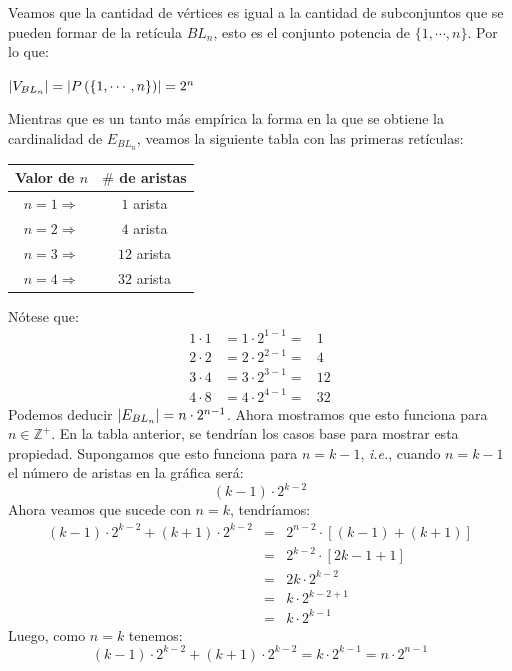 \documentclass{article}
\begin{document}
\begin{enumerate}
\begin{enumerate}
      Veamos que la cantidad de vértices es igual a la
      cantidad de subconjuntos que se pueden formar de
      la retícula $BL_n$, esto es el conjunto potencia
      de $\{1, \dotsm, n\}$. Por lo que:
      \begin{center}
        $\abs{V_{BL_n}} = \abs{P \left(\{1, \dotsm, n\}\right)} = 2^{n}$
      \end{center}
      Mientras que es un tanto más empírica la forma en
      la que se obtiene la cardinalidad de $E_{BL_n}$,
      veamos la siguiente tabla con las primeras retículas:
      \begin{center}
        \begin{tabular}{|c|c|}
          \hline
          Valor de $n$ & $\#$ de aristas \\
          \hline
          $n = 1 \Rightarrow$ & $1$ arista \\
          \hline
          $n = 2 \Rightarrow$ & $4$ arista \\
          \hline
          $n = 3 \Rightarrow$ & $12$ arista \\
          \hline
          $n = 4 \Rightarrow$ & $32$ arista \\
          \hline
        \end{tabular}
      \end{center}
      Nótese que:
      \begin{eqnarray*}
        1 \cdot 1 &= 1 \cdot 2^{1-1} =& 1\\
        2 \cdot 2 &= 2 \cdot 2^{2-1} =& 4\\
        3 \cdot 4 &= 3 \cdot 2^{3-1} =& 12\\
        4 \cdot 8 &= 4 \cdot 2^{4-1} =& 32
      \end{eqnarray*}
      Podemos deducir $\abs{E_{BL_n}} = n \cdot 2^{n-1}$.
      Ahora mostramos que esto funciona para
      $n \in \mathbb{Z}^{+}$. En la tabla anterior, se
      tendrían los casos base para mostrar esta propiedad.
      Supongamos que esto funciona para $n = k -1$,
      \textit{i.e.}, cuando $n = k-1$ el número de aristas
      en la gráfica será:
      \[
      (k -1) \cdot 2^{k -2}
      \]
      Ahora veamos que sucede con $n = k$, tendríamos:
      \begin{eqnarray*}
        (k -1) \cdot 2^{k -2} + (k +1) \cdot 2^{k -2} &=&
        2^{n -2} \cdot [(k -1) + (k +1)]\\
        &=& 2^{k -2} \cdot [2k -1 +1]\\
        &=& 2k \cdot 2^{k -2}\\
        &=& k \cdot 2^{k -2 + 1}\\
        &=& k \cdot 2^{k -1}
      \end{eqnarray*}
      Luego, como $n = k$ tenemos:
      \[
      (k -1) \cdot 2^{k -2} + (k +1) \cdot 2^{k -2} =
      k \cdot 2^{k -1} = n \cdot 2^{n -1}
      \]
      

\end{enumerate}
\end{enumerate}
\end{document}
